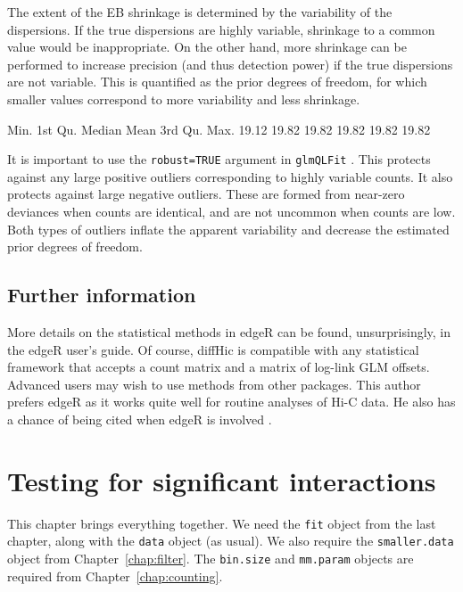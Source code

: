 \documentclass[12pt]{report}
\renewenvironment{Schunk}{\vspace{0pt}}{\vspace{0pt}}
\newcommand{\edgeR}{edgeR}
\newcommand{\pkgname}{diffHic}
\newcommand{\code}[1]{{\small\texttt{#1}}}
\newenvironment{combox}
{ \begin{shaded}\begin{center}\begin{minipage}[t]{0.95\textwidth} }
{ \end{minipage}\end{center}\end{shaded} }
\begin{document}
The extent of the EB shrinkage is determined by the variability of the dispersions.
If the true dispersions are highly variable, shrinkage to a common value would be inappropriate.
On the other hand, more shrinkage can be performed to increase precision (and thus detection power) if the true dispersions are not variable.
This is quantified as the prior degrees of freedom, for which smaller values correspond to more variability and less shrinkage.

\begin{Schunk}
\begin{Soutput}
   Min. 1st Qu.  Median    Mean 3rd Qu.    Max. 
  19.12   19.82   19.82   19.82   19.82   19.82 
\end{Soutput}
\end{Schunk}

It is important to use the \code{robust=TRUE} argument in \code{glmQLFit} \citep{phipson2016robust}.
This protects against any large positive outliers corresponding to highly variable counts.
It also protects against large negative outliers.
These are formed from near-zero deviances when counts are identical, and are not uncommon when counts are low.
Both types of outliers inflate the apparent variability and decrease the estimated prior degrees of freedom.

\section{Further information}
More details on the statistical methods in \edgeR{} can be found, unsurprisingly, in the \edgeR{} user's guide.
Of course, \pkgname{} is compatible with any statistical framework that accepts a count matrix and a matrix of log-link GLM offsets.
Advanced users may wish to use methods from other packages.
This author prefers \edgeR{} as it works quite well for routine analyses of Hi-C data.
He also has a chance of being cited when \edgeR{} is involved \citep{chen2014differential}.

\chapter{Testing for significant interactions}

\begin{combox}
This chapter brings everything together.
We need the \code{fit} object from the last chapter, along with the \code{data} object (as usual).
We also require the \code{smaller.data} object from Chapter~\ref{chap:filter}.
The \code{bin.size} and \code{mm.param} objects are required from Chapter~\ref{chap:counting}.
\end{combox}
\end{document}
